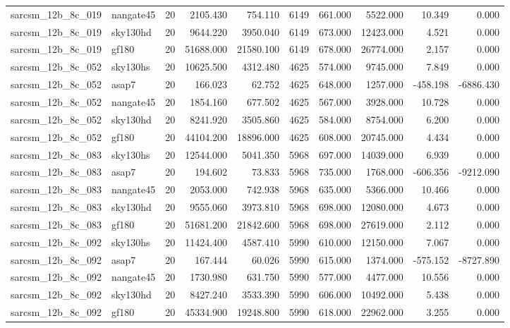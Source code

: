 \documentclass{article}
\begin{document}
\begin{longtable}{llrrrrrrrr}
sarcsm\_12b\_8c\_019 & nangate45 & 20 & 2105.430 & 754.110 & 6149 & 661.000 & 5522.000 & 10.349 & 0.000 \\
sarcsm\_12b\_8c\_019 & sky130hd & 20 & 9644.220 & 3950.040 & 6149 & 673.000 & 12423.000 & 4.521 & 0.000 \\
sarcsm\_12b\_8c\_019 & gf180 & 20 & 51688.000 & 21580.100 & 6149 & 678.000 & 26774.000 & 2.157 & 0.000 \\
sarcsm\_12b\_8c\_052 & sky130hs & 20 & 10625.500 & 4312.480 & 4625 & 574.000 & 9745.000 & 7.849 & 0.000 \\
sarcsm\_12b\_8c\_052 & asap7 & 20 & 166.023 & 62.752 & 4625 & 648.000 & 1257.000 & -458.198 & -6886.430 \\
sarcsm\_12b\_8c\_052 & nangate45 & 20 & 1854.160 & 677.502 & 4625 & 567.000 & 3928.000 & 10.728 & 0.000 \\
sarcsm\_12b\_8c\_052 & sky130hd & 20 & 8241.920 & 3505.860 & 4625 & 584.000 & 8754.000 & 6.200 & 0.000 \\
sarcsm\_12b\_8c\_052 & gf180 & 20 & 44104.200 & 18896.000 & 4625 & 608.000 & 20745.000 & 4.434 & 0.000 \\
sarcsm\_12b\_8c\_083 & sky130hs & 20 & 12544.000 & 5041.350 & 5968 & 697.000 & 14039.000 & 6.939 & 0.000 \\
sarcsm\_12b\_8c\_083 & asap7 & 20 & 194.602 & 73.833 & 5968 & 735.000 & 1768.000 & -606.356 & -9212.090 \\
sarcsm\_12b\_8c\_083 & nangate45 & 20 & 2053.000 & 742.938 & 5968 & 635.000 & 5366.000 & 10.466 & 0.000 \\
sarcsm\_12b\_8c\_083 & sky130hd & 20 & 9555.060 & 3973.810 & 5968 & 698.000 & 12080.000 & 4.673 & 0.000 \\
sarcsm\_12b\_8c\_083 & gf180 & 20 & 51681.200 & 21842.600 & 5968 & 698.000 & 27619.000 & 2.112 & 0.000 \\
sarcsm\_12b\_8c\_092 & sky130hs & 20 & 11424.400 & 4587.410 & 5990 & 610.000 & 12150.000 & 7.067 & 0.000 \\
sarcsm\_12b\_8c\_092 & asap7 & 20 & 167.444 & 60.026 & 5990 & 615.000 & 1374.000 & -575.152 & -8727.890 \\
sarcsm\_12b\_8c\_092 & nangate45 & 20 & 1730.980 & 631.750 & 5990 & 577.000 & 4477.000 & 10.556 & 0.000 \\
sarcsm\_12b\_8c\_092 & sky130hd & 20 & 8427.240 & 3533.390 & 5990 & 606.000 & 10492.000 & 5.438 & 0.000 \\
sarcsm\_12b\_8c\_092 & gf180 & 20 & 45334.900 & 19248.800 & 5990 & 618.000 & 22962.000 & 3.255 & 0.000 \\

\end{longtable}
\end{document}
